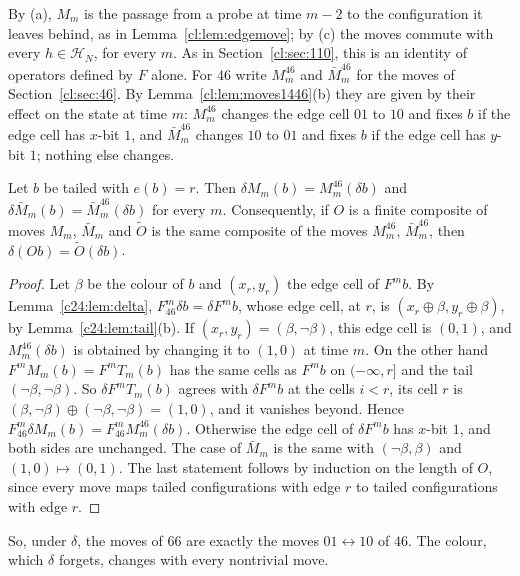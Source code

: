 By (a), $M_m$ is the passage from a probe at time $m-2$ to the configuration it leaves behind, as in Lemma~\ref{cl:lem:edgemove}; by (c) the moves commute with every $h\in\mathcal H_N$, for every $m$. As in Section~\ref{cl:sec:110}, this is an identity of operators defined by $F$ alone. For $46$ write $M^{46}_m$ and $\bar M^{46}_m$ for the moves of Section~\ref{cl:sec:46}. By Lemma~\ref{cl:lem:moves1446}(b) they are given by their effect on the state at time $m$: $M^{46}_m$ changes the edge cell $01$ to $10$ and fixes $b$ if the edge cell has $x$-bit $1$, and $\bar M^{46}_m$ changes $10$ to $01$ and fixes $b$ if the edge cell has $y$-bit $1$; nothing else changes.

\begin{lemma}\label{c24:lem:moves46}
Let $b$ be tailed with $e(b)=r$. Then $\delta M_m(b)=M^{46}_m(\delta b)$ and $\delta\bar M_m(b)=\bar M^{46}_m(\delta b)$ for every $m$. Consequently, if $O$ is a finite composite of moves $M_m$, $\bar M_m$ and $\tilde O$ is the same composite of the moves $M^{46}_m$, $\bar M^{46}_m$, then $\delta(Ob)=\tilde O(\delta b)$.
\end{lemma}

\begin{proof}
Let $\beta$ be the colour of $b$ and $(x_r,y_r)$ the edge cell of $F^mb$. By Lemma~\ref{c24:lem:delta}, $F_{46}^m\delta b=\delta F^mb$, whose edge cell, at $r$, is $(x_r\oplus\beta,y_r\oplus\beta)$, by Lemma~\ref{c24:lem:tail}(b). If $(x_r,y_r)=(\beta,\neg\beta)$, this edge cell is $(0,1)$, and $M^{46}_m(\delta b)$ is obtained by changing it to $(1,0)$ at time $m$. On the other hand $F^mM_m(b)=F^mT_m(b)$ has the same cells as $F^mb$ on $(-\infty,r]$ and the tail $(\neg\beta,\neg\beta)$. So $\delta F^mT_m(b)$ agrees with $\delta F^mb$ at the cells $i<r$, its cell $r$ is $(\beta,\neg\beta)\oplus(\neg\beta,\neg\beta)=(1,0)$, and it vanishes beyond. Hence $F_{46}^m\delta M_m(b)=F_{46}^mM^{46}_m(\delta b)$. Otherwise the edge cell of $\delta F^mb$ has $x$-bit $1$, and both sides are unchanged. The case of $\bar M_m$ is the same with $(\neg\beta,\beta)$ and $(1,0)\mapsto(0,1)$. The last statement follows by induction on the length of $O$, since every move maps tailed configurations with edge $r$ to tailed configurations with edge $r$.
\end{proof}

So, under $\delta$, the moves of $66$ are exactly the moves $01\leftrightarrow10$ of $46$. The colour, which $\delta$ forgets, changes with every nontrivial move.

